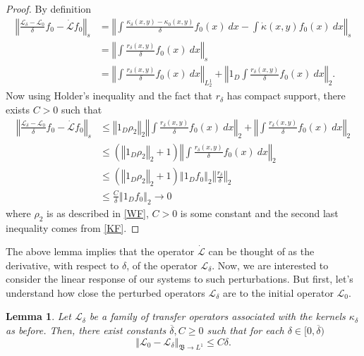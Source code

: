 \documentclass{amsart}
\newtheorem{lemma}[theorem]{Lemma}
\newcommand\cL{{\mathcal L}}
\newcommand\fB{{\mathfrak B}}
\newcommand{\norm}[1]{\left\Vert#1\right\Vert}
\begin{document}
\begin{proof}
By definition 
\[
\begin{split}
\norm{\frac{\cL_{\delta }-\cL_{0}}{\delta }f_{0}-\dot{\cL}f_{0}}_{s} &=\norm{\int \frac{\kappa_{\delta }(x,y)-\kappa_{0}(x,y)}{\delta }f_{0}(x)\
dx-\int \dot{\kappa}(x,y)f_{0}(x)\ dx}_{s} \\
&=\norm{\int \frac{r_{\delta }(x,y)}{\delta }f_{0}(x)\ dx}_{s}\\
&=\norm{\int \frac{r_{\delta }(x,y)}{\delta }f_{0}(x)\ dx}_{L^1_2}
     + \norm{1_D\int \frac{r_{\delta }(x,y)}{\delta }f_{0}(x)\ dx}_{2}.
\end{split}
\]
Now using Holder's inequality and the fact that $r_{\delta }$ has compact support, there exists $C>0$ such that 
\[
\begin{split}
    \norm{\frac{\cL_{\delta }-\cL_{0}}{\delta }f_{0}-\dot{\cL}f_{0}}_{s}
    &\leq\norm{1_D\rho_2}_2\norm{\int \frac{r_{\delta }(x,y)}{\delta }f_{0}(x)\ dx}_{2}+     \norm{\int \frac{r_{\delta }(x,y)}{\delta }f_{0}(x)\ dx}_{2}\\
    &\leq(\norm{1_D\rho_2}_2+1)\norm{\int \frac{r_{\delta }(x,y)}{\delta }f_{0}(x)\ dx}_{2}\\
    &\leq (\norm{1_D\rho_2}_2+1)\norm{1_Df_{0}}_{2} \norm{\frac{r_{\delta }}{\delta }}_{2}\\
    &\leq  \frac{C}{\delta }\norm{1_Df_{0}}_{2}\rightarrow 0
\end{split}
\]
where \(\rho_2\) is as described in \eqref{WF}, \(C>0\) is some constant and the second last inequality comes from \eqref{KF}.
\end{proof}
The above lemma implies that the operator \(\dot\cL\) can be thought of as the derivative, with respect to \(\delta\), of the operator \(\cL_\delta\).
Now, we are interested to consider the linear response of our systems to such perturbations. But first, let's understand how close the perturbed operators \(\cL_\delta\) are to the initial operator \(\cL_0\).

\begin{lemma}\label{lem:close}
Let $\cL_{\delta }$ be a family of transfer operators associated with the kernels $\kappa_{\delta }$ as before. Then, there exist constants $\overline{\delta }, C\geq 0$ such that for each $\delta\in \lbrack 0,\overline{\delta })$ 
\begin{equation}
\norm{\cL_{0}-\cL_{\delta }}_{\fB\rightarrow L^{1}}\leq C\delta. 
\end{equation}
\end{lemma}
\end{document}
